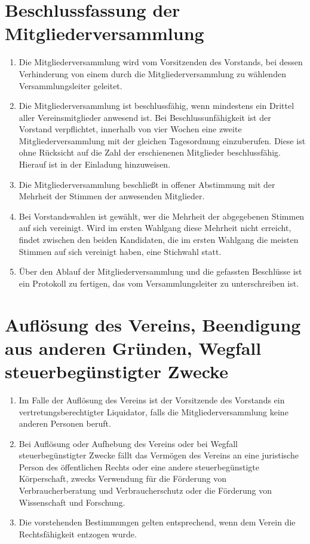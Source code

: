 \section{Beschlussfassung der Mitgliederversammlung}
\begin{enumerate}[label=(\arabic*)]
    \item Die Mitgliederversammlung wird vom Vorsitzenden des Vorstands, bei
        dessen Verhinderung von einem durch die Mitgliederversammlung zu wählenden
        Versammlungsleiter geleitet.
    \item Die Mitgliederversammlung ist beschlussfähig, wenn mindestens ein
        Drittel aller Vereinsmitglieder anwesend ist. Bei Beschlussunfähigkeit
        ist der Vorstand verpflichtet, innerhalb von vier Wochen eine zweite
        Mitgliederversammlung mit der gleichen Tagesordnung einzuberufen.
        Diese ist ohne Rücksicht auf die Zahl der erschienenen Mitglieder
        beschlussfähig. Hierauf ist in der Einladung hinzuweisen.
    \item Die Mitgliederversammlung beschließt in offener Abstimmung mit der
        Mehrheit der Stimmen der anwesenden Mitglieder.
    \item Bei Vorstandswahlen ist gewählt, wer die Mehrheit der abgegebenen
        Stimmen auf sich vereinigt. Wird im ersten Wahlgang diese Mehrheit
        nicht erreicht, findet zwischen den beiden Kandidaten, die im ersten
        Wahlgang die meisten Stimmen auf sich vereinigt haben, eine Stichwahl
        statt. 
    \item Über den Ablauf der Mitgliederversammlung und die gefassten
        Beschlüsse ist ein Protokoll zu fertigen, das vom Versammlungsleiter zu
        unterschreiben ist.
\end{enumerate}

\section{Auflösung des Vereins, Beendigung aus anderen Gründen, Wegfall steuerbegünstigter Zwecke}
\begin{enumerate}[label=(\arabic*)]
    \item Im Falle der Auflösung des Vereins ist der Vorsitzende des Vorstands
        ein vertretungsberechtigter Liquidator, falls die
        Mitgliederversammlung keine anderen Personen beruft.
    \item Bei Auflösung oder Aufhebung des Vereins oder bei Wegfall
        steuerbegünstigter Zwecke fällt das Vermögen des Vereins an eine
        juristische Person des öffentlichen Rechts oder eine andere
        steuerbegünstigte Körperschaft, zwecks Verwendung für die Förderung von
        Verbraucherberatung und Verbraucherschutz oder die Förderung von
        Wissenschaft und Forschung.
    \item Die vorstehenden Bestimmungen gelten entsprechend, wenn dem Verein
        die Rechtsfähigkeit entzogen wurde.
\end{enumerate}

